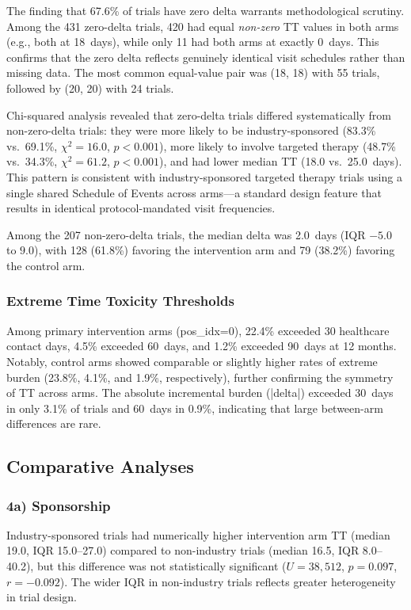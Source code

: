 \documentclass[11pt,a4paper]{article}
\begin{document}
The finding that 67.6\% of trials have zero delta warrants methodological scrutiny. Among the 431 zero-delta trials, 420 had equal \emph{non-zero} TT values in both arms (e.g., both at 18~days), while only 11 had both arms at exactly 0~days. This confirms that the zero delta reflects genuinely identical visit schedules rather than missing data. The most common equal-value pair was (18, 18) with 55 trials, followed by (20, 20) with 24 trials.

Chi-squared analysis revealed that zero-delta trials differed systematically from non-zero-delta trials: they were more likely to be industry-sponsored (83.3\% vs.\ 69.1\%, $\chi^2=16.0$, $p<0.001$), more likely to involve targeted therapy (48.7\% vs.\ 34.3\%, $\chi^2=61.2$, $p<0.001$), and had lower median TT (18.0 vs.\ 25.0~days). This pattern is consistent with industry-sponsored targeted therapy trials using a single shared Schedule of Events across arms---a standard design feature that results in identical protocol-mandated visit frequencies.

Among the 207 non-zero-delta trials, the median delta was 2.0~days (IQR $-5.0$ to $9.0$), with 128 (61.8\%) favoring the intervention arm and 79 (38.2\%) favoring the control arm.

\subsubsection{Extreme Time Toxicity Thresholds}

Among primary intervention arms (pos\_idx=0), 22.4\% exceeded 30 healthcare contact days, 4.5\% exceeded 60~days, and 1.2\% exceeded 90~days at 12 months. Notably, control arms showed comparable or slightly higher rates of extreme burden (23.8\%, 4.1\%, and 1.9\%, respectively), further confirming the symmetry of TT across arms. The absolute incremental burden (|delta|) exceeded 30~days in only 3.1\% of trials and 60~days in 0.9\%, indicating that large between-arm differences are rare.

\subsection{Comparative Analyses}

\subsubsection{4a) Sponsorship}

Industry-sponsored trials had numerically higher intervention arm TT (median 19.0, IQR 15.0--27.0) compared to non-industry trials (median 16.5, IQR 8.0--40.2), but this difference was not statistically significant ($U=38{,}512$, $p=0.097$, $r=-0.092$). The wider IQR in non-industry trials reflects greater heterogeneity in trial design.
\end{document}
